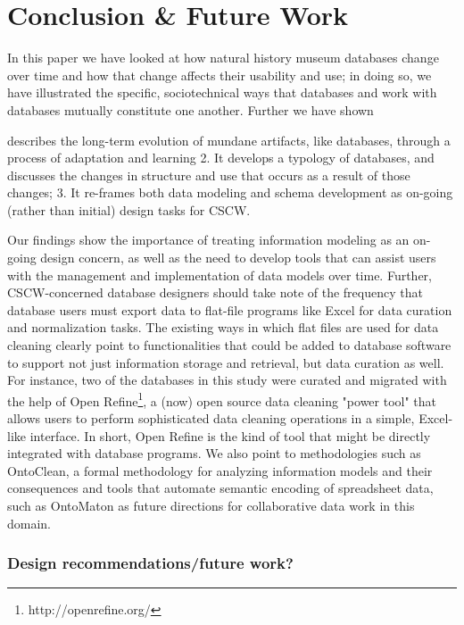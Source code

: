 \section{Conclusion & Future Work}

In this paper we have looked at how natural history museum databases change over time and how that change affects their usability and use; in doing so, we have illustrated the specific, sociotechnical ways that databases and work with databases mutually constitute one another. Further we have shown

describes the long-term evolution of mundane artifacts, like databases, through a process of adaptation and learning 2. It develops a typology of databases, and discusses the changes in structure and use that occurs as a result of those changes; 3. It re-frames both data modeling and schema development as on-going (rather than initial) design tasks for CSCW.

Our findings show the importance of treating information modeling as an on-going design concern, as well as the need to develop tools that can assist users with the management and implementation of data models over time. Further, CSCW-concerned database designers should take note of the frequency that database users must export data to flat-file programs like Excel for data curation and normalization tasks. The existing ways in which flat files are used for data cleaning clearly point to functionalities that could be added to database software to support not just information storage and retrieval, but data curation as well.  For instance, two of the databases in this study were curated and migrated with the help of Open Refine\footnote{http://openrefine.org/}, a (now) open source data cleaning "power tool" that allows users to perform sophisticated data cleaning operations in a simple, Excel-like interface.  In short, Open Refine is the kind of tool that might be directly integrated with database programs. We also point to methodologies such as OntoClean, a formal methodology for analyzing information models and their consequences \cite{Guarino_2004} and tools that automate semantic encoding of spreadsheet data, such as OntoMaton \cite{Maguire_2012} as future directions for collaborative data work in this domain. 



\subsubsection{Design recommendations/future work?}

